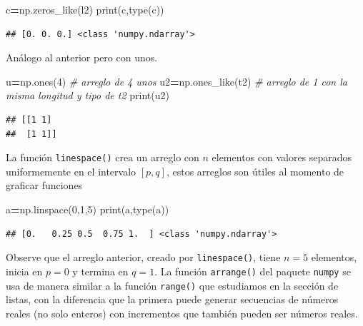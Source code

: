 \documentclass[
]{book}
\newenvironment{Shaded}{\begin{snugshade}}{\end{snugshade}}
\newcommand{\BuiltInTok}[1]{#1}
\newcommand{\CommentTok}[1]{\textcolor[rgb]{0.56,0.35,0.01}{\textit{#1}}}
\newcommand{\DecValTok}[1]{\textcolor[rgb]{0.00,0.00,0.81}{#1}}
\newcommand{\NormalTok}[1]{#1}
\newcommand{\OperatorTok}[1]{\textcolor[rgb]{0.81,0.36,0.00}{\textbf{#1}}}
\theoremstyle{definition}
\theoremstyle{definition}
\theoremstyle{definition}
\theoremstyle{definition}
\theoremstyle{remark}
\begin{document}
\begin{Shaded}
\begin{Highlighting}[]
\NormalTok{c}\OperatorTok{=}\NormalTok{np.zeros\_like(l2)}
\BuiltInTok{print}\NormalTok{(c,}\BuiltInTok{type}\NormalTok{(c))}
\end{Highlighting}
\end{Shaded}

\begin{verbatim}
## [0. 0. 0.] <class 'numpy.ndarray'>
\end{verbatim}

Análogo al anterior pero con unos.

\begin{Shaded}
\begin{Highlighting}[]
\NormalTok{u}\OperatorTok{=}\NormalTok{np.ones(}\DecValTok{4}\NormalTok{) }\CommentTok{\# arreglo de 4 unos  }
\NormalTok{u2}\OperatorTok{=}\NormalTok{np.ones\_like(t2) }\CommentTok{\# arreglo de 1 con la misma longitud y tipo de t2   }
\BuiltInTok{print}\NormalTok{(u2)}
\end{Highlighting}
\end{Shaded}

\begin{verbatim}
## [[1 1]
##  [1 1]]
\end{verbatim}

La función \texttt{linespace()} crea un arreglo con \(n\) elementos con valores separados uniformemente en el intervalo \([p,q]\), estos arreglos son útiles al momento de graficar funciones

\begin{Shaded}
\begin{Highlighting}[]
\NormalTok{a}\OperatorTok{=}\NormalTok{np.linspace(}\DecValTok{0}\NormalTok{,}\DecValTok{1}\NormalTok{,}\DecValTok{5}\NormalTok{) }
\BuiltInTok{print}\NormalTok{(a,}\BuiltInTok{type}\NormalTok{(a)) }
\end{Highlighting}
\end{Shaded}

\begin{verbatim}
## [0.   0.25 0.5  0.75 1.  ] <class 'numpy.ndarray'>
\end{verbatim}

Observe que el arreglo anterior, creado por \texttt{linespace()}, tiene \(n=5\) elementos, inicia en \(p=0\) y termina en \(q=1\). La función \texttt{arrange()} del paquete \texttt{numpy} se usa de manera similar a la función \texttt{range()} que estudiamos en la sección de listas, con la diferencia que la primera puede generar secuencias de números reales (no solo enteros) con incrementos que también pueden ser números reales.
\end{document}
